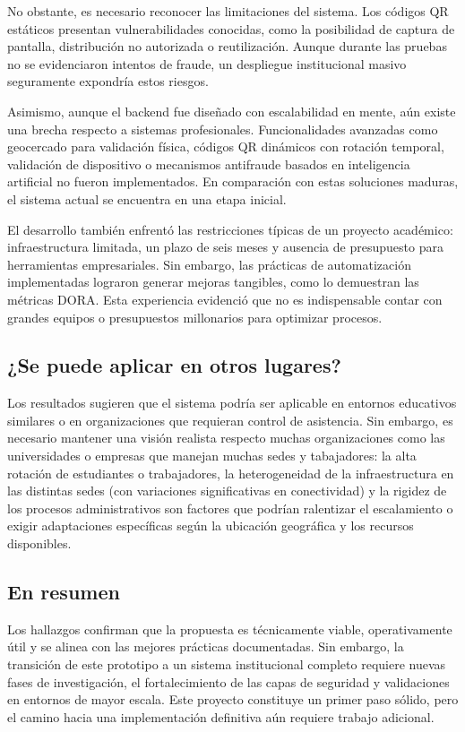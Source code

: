 No obstante, es necesario reconocer las limitaciones del sistema. Los códigos QR estáticos presentan vulnerabilidades conocidas, como la posibilidad de captura de pantalla, distribución no autorizada o reutilización. Aunque durante las pruebas no se evidenciaron intentos de fraude, un despliegue institucional masivo seguramente expondría estos riesgos.

Asimismo, aunque el backend fue diseñado con escalabilidad en mente, aún existe una brecha respecto a sistemas profesionales. Funcionalidades avanzadas como geocercado para validación física, códigos QR dinámicos con rotación temporal, validación de dispositivo o mecanismos antifraude basados en inteligencia artificial no fueron implementados. En comparación con estas soluciones maduras, el sistema actual se encuentra en una etapa inicial.

El desarrollo también enfrentó las restricciones típicas de un proyecto académico: infraestructura limitada, un plazo de seis meses y ausencia de presupuesto para herramientas empresariales. Sin embargo, las prácticas de automatización implementadas lograron generar mejoras tangibles, como lo demuestran las métricas DORA. Esta experiencia evidenció que no es indispensable contar con grandes equipos o presupuestos millonarios para optimizar procesos.

\subsection{¿Se puede aplicar en otros lugares?}

Los resultados sugieren que el sistema podría ser aplicable en entornos educativos similares o en organizaciones que requieran control de asistencia. Sin embargo, es necesario mantener una visión realista respecto muchas organizaciones como las universidades o empresas que manejan muchas sedes y tabajadores: la alta rotación de estudiantes o trabajadores, la heterogeneidad de la infraestructura en las distintas sedes (con variaciones significativas en conectividad) y la rigidez de los procesos administrativos son factores que podrían ralentizar el escalamiento o exigir adaptaciones específicas según la ubicación geográfica y los recursos disponibles.

\subsection{En resumen}

Los hallazgos confirman que la propuesta es técnicamente viable, operativamente útil y se alinea con las mejores prácticas documentadas. Sin embargo, la transición de este prototipo a un sistema institucional completo requiere nuevas fases de investigación, el fortalecimiento de las capas de seguridad y validaciones en entornos de mayor escala. Este proyecto constituye un primer paso sólido, pero el camino hacia una implementación definitiva aún requiere trabajo adicional.